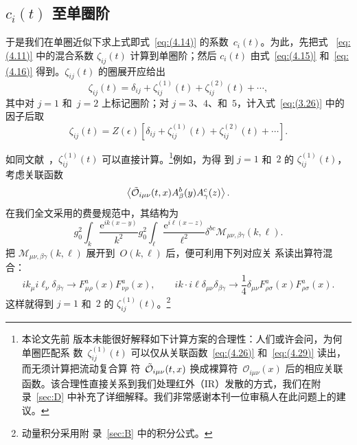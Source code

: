 \subsection{$c_i(t)$ 至单圈阶}
于是我们在单圈近似下求上式即式~\eqref{eq:(4.14)} 的系数~$c_i(t)$。为此，先把式%
~\eqref{eq:(4.11)} 中的混合系数 $\zeta_{ij}(t)$ 计算到单圈阶；然后 $c_i(t)$
由式~\eqref{eq:(4.15)} 和~\eqref{eq:(4.16)} 得到。$\zeta_{ij}(t)$ 的圈展开应给出
\begin{equation}
   \zeta_{ij}(t)=\delta_{ij}+\zeta_{ij}^{(1)}(t)+\zeta_{ij}^{(2)}(t)+\dotsb,
\label{eq:(4.24)}
\end{equation}
其中对 $j=1$ 和~$j=2$ 上标记圈阶；对 $j=3$、$4$、和~$5$，计入式~\eqref{eq:(3.26)}
中的因子后取
\begin{equation}
   \zeta_{ij}(t)=Z(\epsilon)
   \left[\delta_{ij}+\zeta_{ij}^{(1)}(t)+\zeta_{ij}^{(2)}(t)+\dotsb\right].
\label{eq:(4.25)}
\end{equation}

如同文献~\cite{Suzuki:2013gza}，$\zeta_{ij}^{(1)}(t)$ 可以直接计算。\footnote{本论文先前
版本未能很好解释如下计算方案的合理性：人们或许会问，为何单圈匹配系
数~$\zeta_{ij}^{(1)}(t)$ 可以仅从关联函数~\eqref{eq:(4.26)} 和~\eqref{eq:(4.29)}
读出，而无须计算把流动复合算
符~$\Tilde{\mathcal{O}}_{i\mu\nu}(t,x)$ 换成裸算符~$\mathcal{O}_{i\mu\nu}(x)$
后的相应关联函数。该合理性直接关系到我们处理红外（IR）发散的方式，我们在附
录~\ref{sec:D} 中补充了详细解释。我们非常感谢本刊一位审稿人在此问题上的建议。}例如，为得
到 $j=1$ 和~$2$ 的 $\zeta_{ij}^{(1)}(t)$，考虑关联函数
\begin{equation}
   \left\langle\Tilde{\mathcal{O}}_{i\mu\nu}(t,x)
   A_\beta^b(y)A_\gamma^c(z)\right\rangle.
\label{eq:(4.26)}
\end{equation}
在我们全文采用的费曼规范中，其结构为
\begin{equation}
   g_0^2\int_k\frac{\mathrm{e}^{ik(x-y)}}{k^2}g_0^2\int_\ell\frac{\mathrm{e}^{i\ell(x-z)}}{\ell^2}
   \delta^{bc}\mathcal{M}_{\mu\nu,\beta\gamma}(k,\ell).
\label{eq:(4.27)}
\end{equation}
把 $\mathcal{M}_{\mu\nu,\beta\gamma}(k,\ell)$ 展开到~$O(k,\ell)$ 后，便可利用下列对应关
系读出算符混合：
\begin{equation}
   ik_\mu i\ell_\nu\delta_{\beta\gamma}\to F_{\mu\rho}^a(x)F_{\nu\rho}^a(x),\qquad
   ik\cdot i\ell\delta_{\mu\nu}\delta_{\beta\gamma}
   \to\frac{1}{4}\delta_{\mu\nu}F_{\rho\sigma}^a(x)F_{\rho\sigma}^a(x).
\label{eq:(4.28)}
\end{equation}
这样就得到 $j=1$ 和~$2$ 的 $\zeta_{ij}^{(1)}(t)$。\footnote{动量积分采用附
录~\ref{sec:B} 中的积分公式。}


